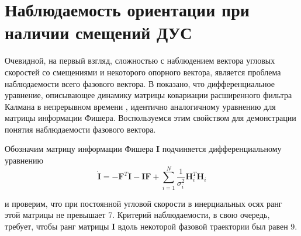 \documentclass{article}
\begin{document}
\section{Наблюдаемость ориентации при наличии смещений ДУС}
Очевидной, на первый взгляд, сложностью с наблюдением вектора угловых скоростей
со смещениями и некоторого опорного вектора, является проблема наблюдаемости
всего фазового вектора. В \cite{TAC1979} показано, что дифференциальное
уравнение, описывающее динамику матрицы ковариации расширенного фильтра
Калмана в непрерывном времени \cite{Davis1984}, идентично аналогичному уравнению для матрицы
информации Фишера. Воспользуемся этим свойством для демонстрации понятия
наблюдаемости фазового вектора.

Обозначим матрицу информации Фишера $\mathbf{I}$ подчиняется дифференциальному
уравнению
$$
\dot{\mathbf{I}} =
-\mathbf{F}^T\mathbf{I}-\mathbf{IF}+\sum_{i=1}^N{\frac{1}{\sigma_i^2}\mathbf{H}_i^T\mathbf{H}_i}
$$

и проверим, что при постоянной угловой скорости в инерциальных осях ранг этой матрицы не
превышает 7. Критерий наблюдаемости, в свою очередь, требует, чтобы ранг
матрицы $\mathbf{I}$ вдоль некоторой фазовой траектории был равен 9.
\end{document}
